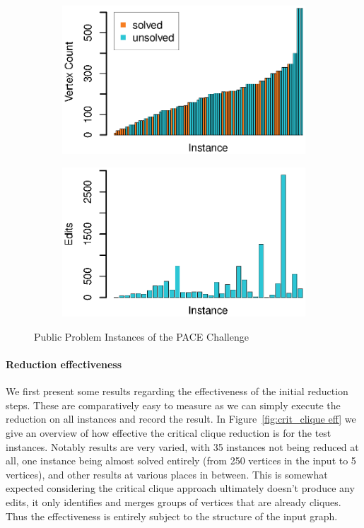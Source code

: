 \documentclass[12pt,oneside,english,parskip=full,headings=small]{scrbook}
\theoremstyle{definition}
\begin{document}
\begin{figure}[h]
	\begin{subfigure}{0.49\textwidth}
		\includegraphics[width=1.0\linewidth]{instances}
	\end{subfigure}
	\begin{subfigure}{0.49\textwidth}
		\includegraphics[width=1.0\linewidth]{solution_sizes}
	\end{subfigure}

	\caption{Public Problem Instances of the PACE Challenge}
	\label{fig:instances}
\end{figure}

\paragraph{Reduction effectiveness} We first present some results regarding the effectiveness of the
initial reduction steps. These are comparatively easy to measure as we can simply execute the
reduction on all instances and record the result. In Figure~\ref{fig:crit_clique eff} we give an
overview of how effective the critical clique reduction is for the test instances. Notably results
are very varied, with 35 instances not being reduced at all, one instance being almost solved
entirely (from 250 vertices in the input to 5 vertices), and other results at various places in
between. This is somewhat expected considering the critical clique approach ultimately doesn't
produce any edits, it only identifies and merges groups of vertices that are already cliques. Thus
the effectiveness is entirely subject to the structure of the input graph.
\end{document}
